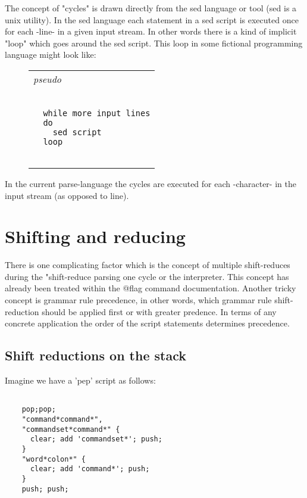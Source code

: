 \documentclass[a4paper,12pt]{article}
\begin{document}
 The concept of "cycles" is drawn directly from the sed
 language or tool (sed is a unix utility). In the sed language
 each statement in a sed script is executed once for each -line-
 in a given input stream. In other words there is a kind of
 implicit "loop" which goes around the sed script. This loop in some
 fictional programming language might look like:
 \begin{figure}
 \begin{tabular}{ l }
 \emph{ pseudo } \\ 
 \begin{lstlisting}[breaklines] 

  while more input lines
  do
    sed script
  loop
 
 \end{lstlisting} 
 \end{tabular} 

 \end{figure}

 In the current parse-language the cycles are executed for each
 -character- in the input stream (as opposed to line).
 
\section{Shifting and reducing}

 There is one complicating factor which is the concept of multiple
 shift-reduces during the "shift-reduce parsing one cycle or the
 interpreter. This concept has already been treated within the @flag command
 documentation. Another tricky concept is grammar rule precedence, in other
 words, which grammar rule shift-reduction should be applied first or with
 greater predence. In terms of any concrete application the order of the
 script statements determines precedence.
 
\subsection{Shift reductions on the stack}

  Imagine we have a 'pep' script as follows: 
 \begin{lstlisting}[breaklines] 

    pop;pop;
    "command*command*",
    "commandset*command*" { 
      clear; add 'commandset*'; push;
    }
    "word*colon*" {
      clear; add 'command*'; push; 
    }      
    push; push;
  
 \end{lstlisting} 
\end{document}
